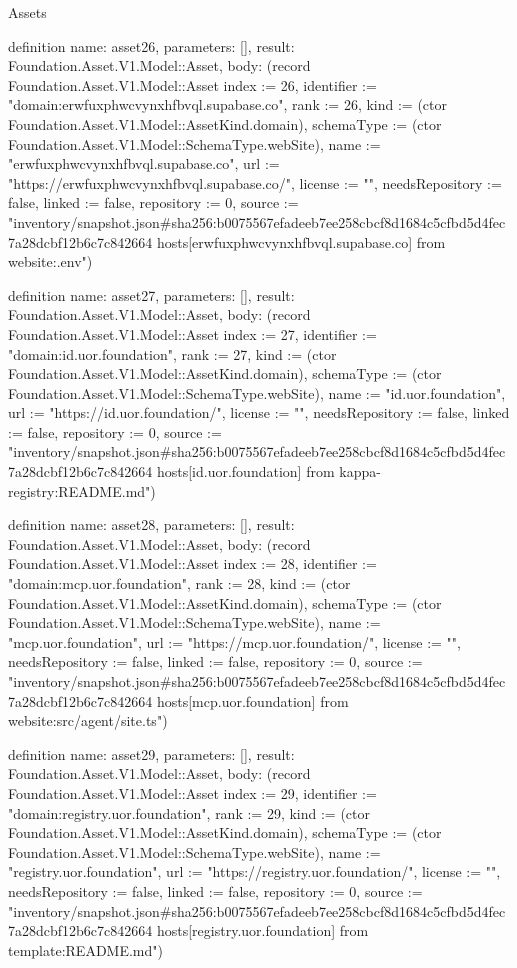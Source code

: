 \begin{lexlean}{Assets}
\begin{semanticmodule}
definition{
  name: asset26,
  parameters: [],
  result: Foundation.Asset.V1.Model::Asset,
  body: (record Foundation.Asset.V1.Model::Asset {index := 26, identifier := "domain:erwfuxphwcvynxhfbvql.supabase.co", rank := 26, kind := (ctor Foundation.Asset.V1.Model::AssetKind.domain), schemaType := (ctor Foundation.Asset.V1.Model::SchemaType.webSite), name := "erwfuxphwcvynxhfbvql.supabase.co", url := "https://erwfuxphwcvynxhfbvql.supabase.co/", license := "", needsRepository := false, linked := false, repository := 0, source := "inventory/snapshot.json#sha256:b0075567efadeeb7ee258cbcf8d1684c5cfbd5d4fec7a28dcbf12b6c7c842664 hosts[erwfuxphwcvynxhfbvql.supabase.co] from website:.env"})
}

definition{
  name: asset27,
  parameters: [],
  result: Foundation.Asset.V1.Model::Asset,
  body: (record Foundation.Asset.V1.Model::Asset {index := 27, identifier := "domain:id.uor.foundation", rank := 27, kind := (ctor Foundation.Asset.V1.Model::AssetKind.domain), schemaType := (ctor Foundation.Asset.V1.Model::SchemaType.webSite), name := "id.uor.foundation", url := "https://id.uor.foundation/", license := "", needsRepository := false, linked := false, repository := 0, source := "inventory/snapshot.json#sha256:b0075567efadeeb7ee258cbcf8d1684c5cfbd5d4fec7a28dcbf12b6c7c842664 hosts[id.uor.foundation] from kappa-registry:README.md"})
}

definition{
  name: asset28,
  parameters: [],
  result: Foundation.Asset.V1.Model::Asset,
  body: (record Foundation.Asset.V1.Model::Asset {index := 28, identifier := "domain:mcp.uor.foundation", rank := 28, kind := (ctor Foundation.Asset.V1.Model::AssetKind.domain), schemaType := (ctor Foundation.Asset.V1.Model::SchemaType.webSite), name := "mcp.uor.foundation", url := "https://mcp.uor.foundation/", license := "", needsRepository := false, linked := false, repository := 0, source := "inventory/snapshot.json#sha256:b0075567efadeeb7ee258cbcf8d1684c5cfbd5d4fec7a28dcbf12b6c7c842664 hosts[mcp.uor.foundation] from website:src/agent/site.ts"})
}

definition{
  name: asset29,
  parameters: [],
  result: Foundation.Asset.V1.Model::Asset,
  body: (record Foundation.Asset.V1.Model::Asset {index := 29, identifier := "domain:registry.uor.foundation", rank := 29, kind := (ctor Foundation.Asset.V1.Model::AssetKind.domain), schemaType := (ctor Foundation.Asset.V1.Model::SchemaType.webSite), name := "registry.uor.foundation", url := "https://registry.uor.foundation/", license := "", needsRepository := false, linked := false, repository := 0, source := "inventory/snapshot.json#sha256:b0075567efadeeb7ee258cbcf8d1684c5cfbd5d4fec7a28dcbf12b6c7c842664 hosts[registry.uor.foundation] from template:README.md"})
}


\end{semanticmodule}
\end{lexlean}
